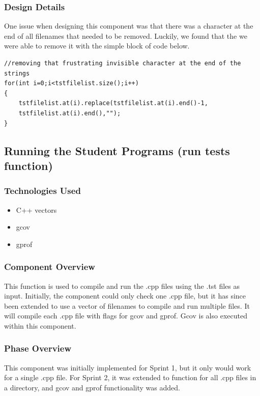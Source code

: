 \documentclass {article}
\begin{document}
			\subsubsection{\large{\color{cyan}Design Details}}
				One issue when designing this component was that there was a character at the end
				 of all filenames that needed to be removed. Luckily, we found that the we were
				 able to remove it with the simple block of code below.
\begin{lstlisting}
//removing that frustrating invisible character at the end of the strings
for(int i=0;i<tstfilelist.size();i++)
{
	tstfilelist.at(i).replace(tstfilelist.at(i).end()-1,
	tstfilelist.at(i).end(),"");
}
\end{lstlisting} 
				 
				 
		\subsection{\Large{\color{blue}Running the Student Programs (run tests function)}}
			\subsubsection{\large{\color{cyan}Technologies Used}}
				 \begin{itemize}
   					\item C++ vectors
    				\item gcov
    				\item gprof
				\end{itemize}
				
			\subsubsection{\large{\color{cyan}Component Overview}}
				This function is used to compile and run the .cpp files using the .tst files as
				 input. Initially, the component could only check one .cpp file, but it has since
				 been extended to use a vector of filenames to compile and run multiple files.
				 It will compile each .cpp file with flags for gcov and gprof. Gcov is also
				 executed within this component.
				 
			\subsubsection{\large{\color{cyan}Phase Overview}}
				This component was initially implemented for Sprint 1, but it only would work for
				 a single .cpp file. For Sprint 2, it was extended to function for all .cpp files
				 in a directory, and gcov and gprof functionality was added.
				 
\end{document}
